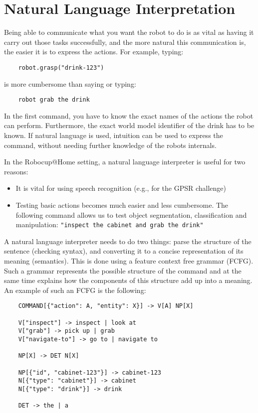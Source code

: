 \usepackage{listings}

\section{Natural Language Interpretation}

Being able to communicate what you want the robot to do is as vital as having it carry out those tasks successfully, and the more natural this communication is, the easier it is to express the actions. For example, typing:

\begin{lstlisting}
    robot.grasp("drink-123")
\end{lstlisting}

is more cumbersome than saying or typing:

\begin{lstlisting}
    robot grab the drink
\end{lstlisting}

In the first command, you have to know the exact names of the actions the robot can perform. Furthermore, the exact world model identifier of the drink has to be known. If natural language is used, intuition can be used to express the command, without needing further knowledge of the robots internals.

In the Robocup@Home setting, a natural language interpreter is useful for two reasons:

\begin{itemize}
    \item It is vital for using speech recognition (e.g., for the GPSR challenge)
    \item Testing basic actions becomes much easier and less cumbersome. The following command allows us to test object segmentation, classification and manipulation: \texttt{"inspect the cabinet and grab the drink"}
\end{itemize}


A natural language interpreter needs to do two things: parse the structure of the sentence (checking syntax), and converting it to a concise representation of its meaning (semantics). This is done using a feature context free grammar (FCFG). Such a grammar represents the possible structure of the command and at the same time explains how the components of this structure add up into a meaning. An example of such an FCFG is the following:

\begin{lstlisting}
    COMMAND[{"action": A, "entity": X}] -> V[A] NP[X]

    V["inspect"] -> inspect | look at
    V["grab"] -> pick up | grab       
    V["navigate-to"] -> go to | navigate to

    NP[X] -> DET N[X]

    NP[{"id", "cabinet-123"}] -> cabinet-123
    N[{"type": "cabinet"}] -> cabinet
    N[{"type": "drink"}] -> drink

    DET -> the | a
\end{lstlisting}

